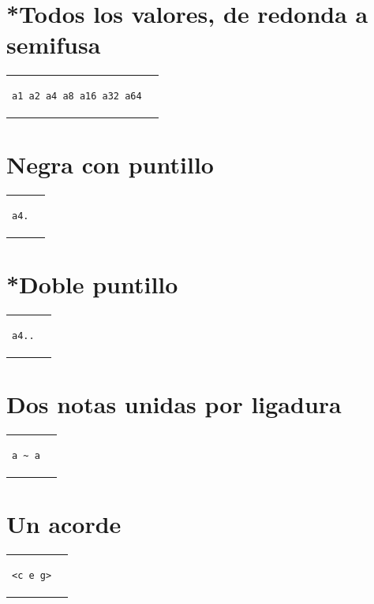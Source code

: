 \documentclass[a4paper,10pt,oneside,headinclude,titlepage]{article} %
\begin{document}
\section*{*Todos los valores, de redonda a semifusa}
\begin{tabular}{m{6cm}m{2cm}}
\begin{verbatim}
a1 a2 a4 a8 a16 a32 a64
\end{verbatim}
&
\begin[fragment,relative=2,notime]{lilypond}
a1 a2 a4 a8 a16 a32 a64
\end{lilypond}
\end{tabular}

\section*{Negra con puntillo}
\begin{tabular}{m{2cm}m{2cm}}
\begin{verbatim}
a4.
\end{verbatim}
&
\begin[fragment,relative=2,notime]{lilypond}
a4.
\end{lilypond}
\end{tabular}

\section*{*Doble puntillo}
\begin{tabular}{m{2cm}m{2cm}}
\begin{verbatim}
a4..
\end{verbatim}
&
\begin[fragment,relative=2,notime]{lilypond}
a4..
\end{lilypond}
\end{tabular}

\section*{Dos notas unidas por ligadura}
\begin{tabular}{m{2cm}m{2cm}}
\begin{verbatim}
a ~ a
\end{verbatim}
&
\begin[fragment,relative=2,notime]{lilypond}
a ~ a
\end{lilypond}
\end{tabular}

\section*{Un acorde}
\begin{tabular}{m{2cm}m{2cm}}
\begin{verbatim}
<c e g>
\end{verbatim}
&
\begin[fragment,relative=1,notime]{lilypond}
<c e g>
\end{lilypond}
\end{tabular}
\end{document}

